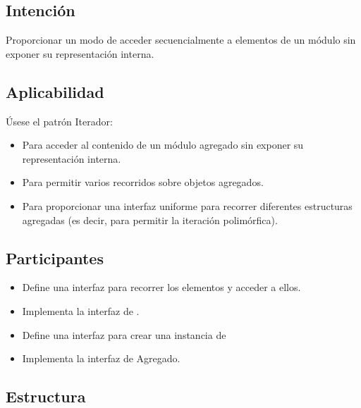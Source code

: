 \subsection*{Intención}
Proporcionar un modo de acceder secuencialmente a elementos de un módulo sin exponer su representación interna.

\subsection*{Aplicabilidad}

Úsese el patrón Iterador:
\begin{itemize}
\item Para acceder al contenido de un módulo agregado sin exponer su representación interna.
\item Para permitir varios recorridos sobre objetos agregados.
\item Para proporcionar una interfaz uniforme para recorrer diferentes estructuras agregadas (es decir, para permitir la iteración polimórfica).

\end{itemize}


\subsection*{Participantes}


\begin{itemize}
\item \Iterador Define una interfaz para recorrer los elementos y acceder a ellos.

\item \IteradorConcreto Implementa la interfaz de \Iterator.

\item \Agregado Define una interfaz para crear una instancia de \Iterator

\item \AgregadoConcreto Implementa la interfaz de Agregado.

\end{itemize}


\subsection*{Estructura}


